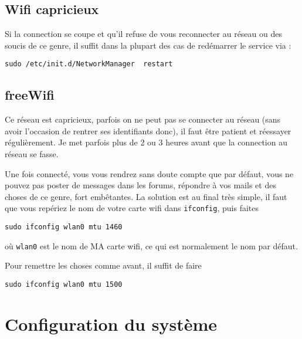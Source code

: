 \documentclass[a4paper,twoside]{article}
\begin{document}
\subsection{Wifi capricieux}
Si la connection se coupe et qu'il refuse de vous reconnecter au réseau ou des soucis de ce genre, il suffit dans la plupart des cas de redémarrer le service via :
\begin{verbatim}
sudo /etc/init.d/NetworkManager  restart
\end{verbatim}

\subsection{freeWifi}
Ce réseau est capricieux, parfois on ne peut pas se connecter au réseau (sans avoir l'occasion de rentrer ses identifiants donc), il faut être patient et réessayer régulièrement. Je met parfois plus de 2 ou 3 heures avant que la connection au réseau se fasse.

Une fois connecté, vous vous rendrez sans doute compte que par défaut, vous ne pouvez pas poster de messages dans les forums, répondre à vos mails et des choses de ce genre, fort embêtantes. La solution est au final très simple, il faut que vous repériez le nom de votre carte wifi dans \verb|ifconfig|, puis faites
\begin{verbatim}
sudo ifconfig wlan0 mtu 1460
\end{verbatim}
où \texttt{wlan0} est le nom de MA carte wifi, ce qui est normalement le nom par défaut.

\bigskip

Pour remettre les choses comme avant, il suffit de faire
\begin{verbatim}
sudo ifconfig wlan0 mtu 1500
\end{verbatim}


\section{Configuration du système}
\end{document}
